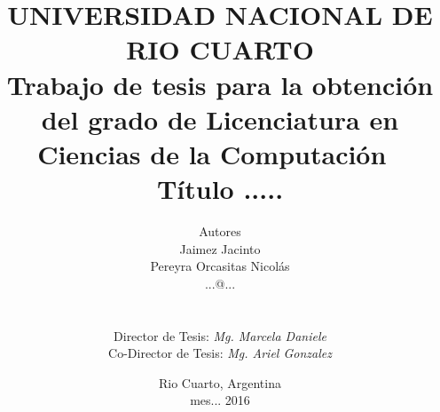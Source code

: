 \documentclass[oneside,letterpaper,10pt,spanish]{report}
\begin{document}
\title{
UNIVERSIDAD NACIONAL DE RIO CUARTO\\
$\;$\\
$\;$\\
\small{Trabajo de tesis para la obtenci\'on del grado de Licenciatura en Ciencias de la Computaci\'on}
$\;$\\$\;$\\
\Large{\textbf{ T\'itulo .....}}
} 

\author{
                        Autores\\
                        Jaimez Jacinto \\
                        Pereyra Orcasitas Nicolás\\
                   ...@...\\ \\ \\
                 Director de Tesis: \emph{Mg. Marcela Daniele}\\ 
                 Co-Director de Tesis: \emph{Mg. Ariel Gonzalez}\\ 
}

\date{Rio Cuarto, Argentina\\ mes... 2016}

 
\maketitle
 

\newpage
\mbox{}
\thispagestyle{empty} %




\listoffigures
{} %

\tableofcontents %


\renewcommand{\sectionmark}[1]{}
\renewcommand{\chaptermark}[1]{\markboth{#1}{}} %


















%

  






\printindex
\end{document}
